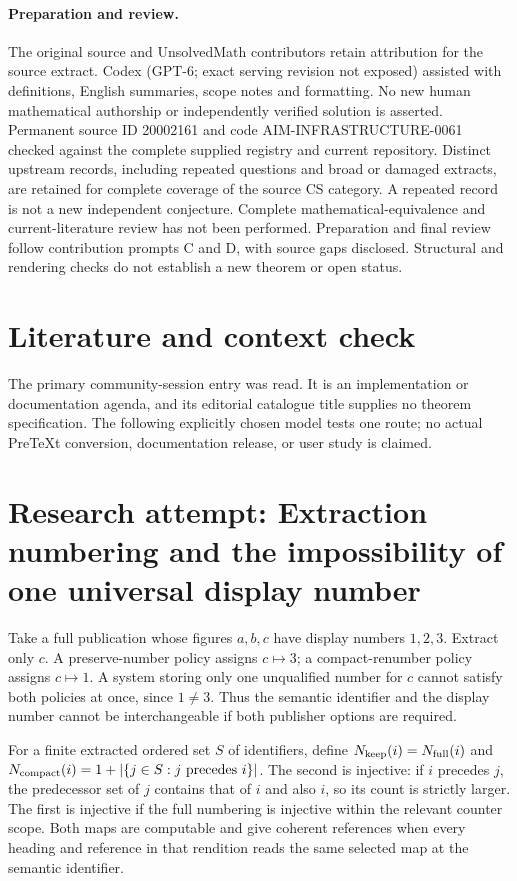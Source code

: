 \documentclass[11pt]{article}
\begin{document}
\paragraph{Preparation and review.}
The original source and UnsolvedMath contributors retain attribution for the source extract. Codex (GPT-6; exact serving revision not exposed) assisted with definitions, English summaries, scope notes and formatting. No new human mathematical authorship or independently verified solution is asserted. Permanent source ID 20002161 and code AIM-INFRASTRUCTURE-0061 checked against the complete supplied registry and current repository. Distinct upstream records, including repeated questions and broad or damaged extracts, are retained for complete coverage of the source CS category. A repeated record is not a new independent conjecture. Complete mathematical-equivalence and current-literature review has not been performed. Preparation and final review follow contribution prompts C and D, with source gaps disclosed. Structural and rendering checks do not establish a new theorem or open status.
\label{end:20002161}

\section{Literature and context check}
The primary community-session entry was read. It is an implementation or documentation agenda, and its editorial catalogue title supplies no theorem specification. The following explicitly chosen model tests one route; no actual PreTeXt conversion, documentation release, or user study is claimed.
\section{Research attempt: Extraction numbering and the impossibility of one universal display number}
Take a full publication whose figures $a,b,c$ have display numbers $1,2,3$. Extract only $c$. A preserve-number policy assigns $c\mapsto3$; a compact-renumber policy assigns $c\mapsto1$. A system storing only one unqualified number for $c$ cannot satisfy both policies at once, since $1\ne3$. Thus the semantic identifier and the display number cannot be interchangeable if both publisher options are required.

For a finite extracted ordered set $S$ of identifiers, define $N_{\rm keep}(i)=N_{\rm full}(i)$ and $N_{\rm compact}(i)=1+|\{j\in S:j\text{ precedes }i\}|$. The second is injective: if $i$ precedes $j$, the predecessor set of $j$ contains that of $i$ and also $i$, so its count is strictly larger. The first is injective if the full numbering is injective within the relevant counter scope. Both maps are computable and give coherent references when every heading and reference in that rendition reads the same selected map at the semantic identifier.
\end{document}
